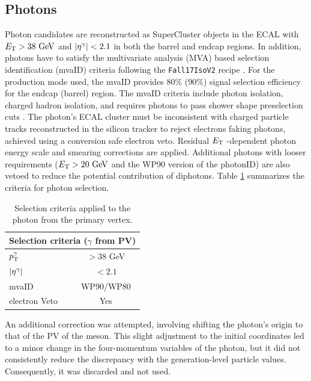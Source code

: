 
\subsection{Photons}\label{subsec:photons}
Photon candidates are reconstructed as SuperCluster objects in the ECAL with $E_\text{T} > 38\ \text{GeV}$ and $\left\lvert\eta^{\gamma}\right\rvert < 2.1$ in both the barrel and endcap regions. In addition, photons have to satisfy the multivariate analysis (MVA) based selection identification (mvaID) criteria following the \verb+Fall17IsoV2+ recipe \cite{CMS:2020uim}. For the production mode used, the mvaID provides 80\% (90\%) signal selection efficiency for the endcap (barrel) region. The mvaID criteria include photon isolation, charged hadron isolation, and requires photons to pass shower shape preselection cuts \cite{Rembser:2019ijh}. The photon's ECAL cluster must be inconsistent with charged particle tracks reconstructed in the silicon tracker to reject electrons faking photons, achieved using a conversion safe electron veto. Residual $E_\text{T}$ -dependent photon energy scale and smearing corrections are applied. Additional photons with looser requirements ($E_\text{T} > 20\ \text{GeV}$ and the WP90 version of the photonID) are also vetoed to reduce the potential contribution of diphotons. Table \ref{tab:photon_selection} summarizes the criteria for photon selection.

\begin{table}[!ht]
    \centering
    \begin{tabular}{|l|c|}
        \hline
            \multicolumn{2}{|c|}{\cellcolor{lightgray}Selection criteria ($\gamma$ from PV)}\\ \hline
            $p_\text{T}^{\gamma}$            &$>38$ GeV\\
            $\left\lvert\eta^{\gamma}\right\rvert$       &$<2.1$ \\
            mvaID                       &WP90/WP80 \\
            electron Veto               &Yes \\\hline
        \end{tabular}
    \caption{Selection criteria applied to the photon from the primary vertex.}
    \label{tab:photon_selection}
\end{table}

An additional correction was attempted, involving shifting the photon's origin to that of the PV of the meson. This slight adjustment to the initial coordinates led to a minor change in the four-momentum variables of the photon, but it did not consistently reduce the discrepancy with the generation-level particle values. Consequently, it was discarded and not used.

